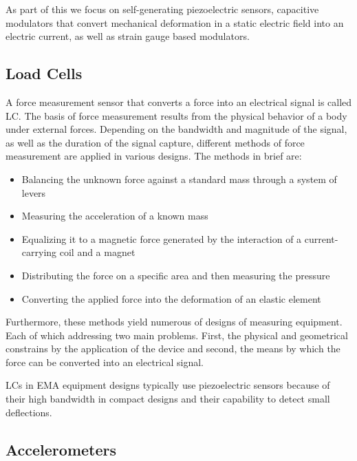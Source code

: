 As part of this we focus on self-generating piezoelectric sensors, capacitive modulators that convert mechanical deformation in a static electric field into an electric current, as well as strain gauge based modulators.

\subsection{Load Cells}

A force measurement sensor that converts a force into an electrical signal is called \acf{LC}. The basis of force measurement results from the physical behavior of a body under external forces. Depending on the bandwidth and magnitude of the signal, as well as the duration of the signal capture, different methods of force measurement are applied in various designs. The methods in brief are:

\begin{itemize}
    \item Balancing the unknown force against a standard mass through a system of levers
    \item Measuring the acceleration of a known mass
    \item Equalizing it to a magnetic force generated by the interaction of a current-carrying coil and a magnet
    \item Distributing the force on a specific area and then measuring the pressure
    \item Converting the applied force into the deformation of an elastic element
\end{itemize}

Furthermore, these methods yield numerous of designs of measuring equipment. Each of which addressing two main problems. First, the physical and geometrical constrains by the application of the device and second, the means by which the force can be converted into an electrical signal.

\ac{LC}s in \ac{EMA} equipment designs typically use piezoelectric sensors because of their high bandwidth in compact designs and their capability to detect small deflections.

\subsection{Accelerometers}


